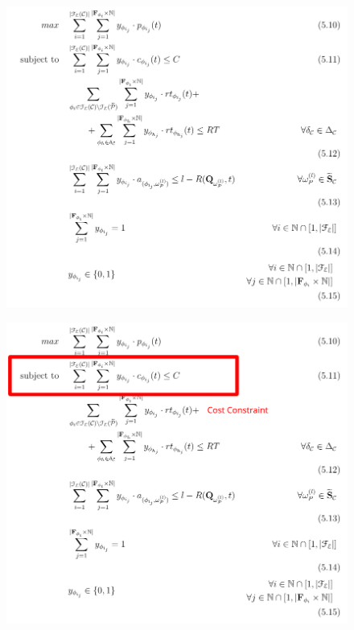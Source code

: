 \documentclass[13.5pt]{beamer}
\begin{document}
\begin{frame}
	
\begin{figure}[h]
	\centering
	\includegraphics[width=\textwidth,height=0.8\columnwidth]{../Images/MMKPForSlide.png}
\end{figure}
	
	
\end{frame}


\begin{frame}[noframenumbering]
	
	\begin{figure}[h]
		\centering
		\includegraphics[width=\textwidth,height=0.8\columnwidth]{../Images/MMKPForSlide2.png}
	\end{figure}
	
	
\end{frame}
\end{document}

